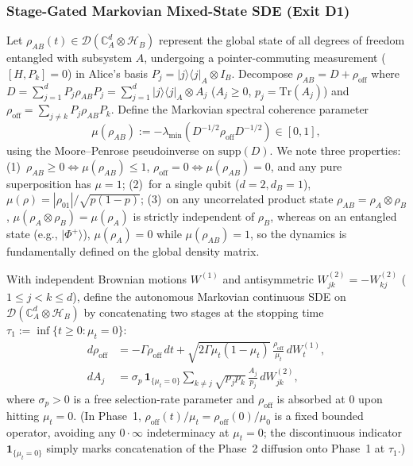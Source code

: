 \documentclass[aps,pra,10pt,twocolumn,superscriptaddress,amsmath,amssymb,floatfix]{revtex4-2}
\newcommand{\Tr}{\mathrm{Tr}}
\newcommand{\ket}[1]{|#1\rangle}
\newcommand{\ketbra}[2]{|#1\rangle\langle #2|}
\begin{document}
\subsubsection{Stage-Gated Markovian Mixed-State SDE (Exit D1)}
Let $\rho_{AB}(t) \in \mathcal{D}(\mathbb{C}^d_A \otimes \mathcal{H}_B)$ represent the global state of all degrees of freedom entangled with subsystem $A$, undergoing a pointer-commuting measurement ($[H, P_k]=0$) in Alice's basis $P_j = \ketbra{j}{j}_A \otimes I_B$. Decompose $\rho_{AB} = D + \rho_{\mathrm{off}}$ where $D = \sum_{j=1}^d P_j \rho_{AB} P_j = \sum_{j=1}^d \ketbra{j}{j}_A \otimes A_j$ ($A_j \ge 0$, $p_j = \Tr(A_j)$) and $\rho_{\mathrm{off}} = \sum_{j \ne k} P_j \rho_{AB} P_k$. Define the Markovian spectral coherence parameter
\begin{equation}
\label{eq:mu_def}
\mu(\rho_{AB}) := -\lambda_{\min}\!\left(D^{-1/2}\rho_{\mathrm{off}} D^{-1/2}\right) \in [0, 1],
\end{equation}
using the Moore--Penrose pseudoinverse on $\mathrm{supp}(D)$. We note three properties: (1)~$\rho_{AB} \ge 0 \iff \mu(\rho_{AB}) \le 1$, $\rho_{\mathrm{off}} = 0 \iff \mu(\rho_{AB}) = 0$, and any pure superposition has $\mu = 1$; (2)~for a single qubit ($d=2, d_B=1$), $\mu(\rho) = |\rho_{01}|/\sqrt{p(1-p)}$; (3)~on any uncorrelated product state $\rho_{AB} = \rho_A \otimes \rho_B$, $\mu(\rho_A\otimes\rho_B) = \mu(\rho_A)$ is strictly independent of $\rho_B$, whereas on an entangled state (e.g., $\ket{\Phi^+}$), $\mu(\rho_A)=0$ while $\mu(\rho_{AB})=1$, so the dynamics is fundamentally defined on the global density matrix.

With independent Brownian motions $W^{(1)}$ and antisymmetric $W^{(2)}_{jk} = -W^{(2)}_{kj}$ ($1 \le j < k \le d$), define the autonomous Markovian continuous SDE on $\mathcal{D}(\mathbb{C}^d_A \otimes \mathcal{H}_B)$ by concatenating two stages at the stopping time $\tau_1 := \inf\{t \ge 0 : \mu_t = 0\}$:
\begin{align}
\label{eq:D1_off}
d\rho_{\mathrm{off}} &= -\Gamma \rho_{\mathrm{off}}\,dt + \sqrt{2\Gamma\mu_t(1-\mu_t)}\,\frac{\rho_{\mathrm{off}}}{\mu_t}\,dW_t^{(1)}, \\
\label{eq:D1_diag}
dA_j &= \sigma_p\,\mathbf{1}_{\{\mu_t = 0\}} \sum_{k \ne j} \sqrt{p_j p_k}\,\frac{A_j}{p_j}\,dW_{jk}^{(2)},
\end{align}
where $\sigma_p > 0$ is a free selection-rate parameter and $\rho_{\mathrm{off}}$ is absorbed at $0$ upon hitting $\mu_t = 0$. (In Phase~1, $\rho_{\mathrm{off}}(t)/\mu_t = \rho_{\mathrm{off}}(0)/\mu_0$ is a fixed bounded operator, avoiding any $0\cdot\infty$ indeterminacy at $\mu_t = 0$; the discontinuous indicator $\mathbf{1}_{\{\mu_t=0\}}$ simply marks concatenation of the Phase~2 diffusion onto Phase~1 at $\tau_1$.)
\end{document}
